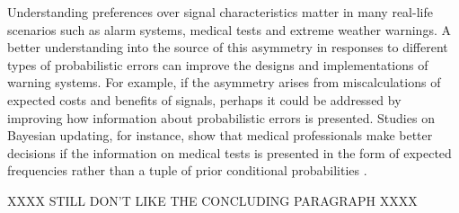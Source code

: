 \documentclass[12pt,a4paper]{article}
\begin{document}

Understanding preferences over signal characteristics matter in many real-life scenarios such as alarm systems, medical tests and extreme weather warnings. 
A better understanding into the source of this asymmetry in responses to different types of probabilistic errors can improve the designs and implementations of warning systems. For example, if the asymmetry arises from miscalculations of expected costs and benefits of signals, perhaps it could be addressed by improving how information about probabilistic errors is presented. Studies on Bayesian updating, for instance, show that medical professionals make better decisions if the information on medical tests is presented in the form of expected frequencies rather than a tuple of prior conditional probabilities \citep{hoffrage_natural_2015, mcdowell_meta-analysis_2017}. 

XXXX STILL DON'T LIKE THE CONCLUDING PARAGRAPH XXXX



\end{document}

